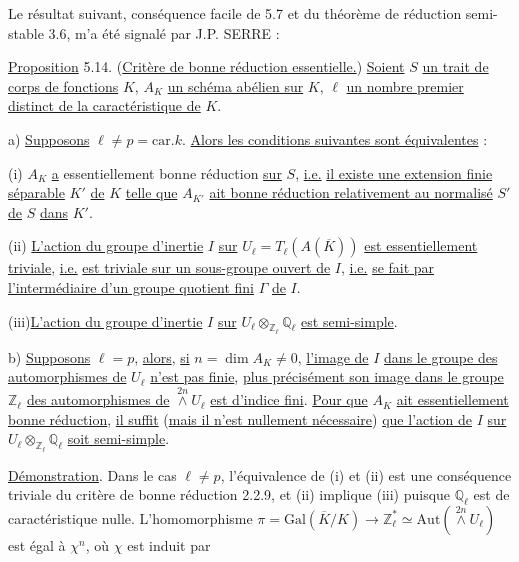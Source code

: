
Le résultat suivant, conséquence facile de 5.7 et du théorème de réduction semi-stable 3.6, m'a été signalé par J.P. SERRE :

\underline{Proposition} 5.14. (\underline{Critère de bonne réduction essentielle.}) \underline{Soient} $S$ \underline{un trait de corps de fonctions} $K$, $A_K$ \underline{un schéma abélien sur} $K$, $\ell$ \underline{un nombre premier distinct de la caractéristique de} $K$.

a) \underline{Supposons} $\ell \neq p = \mathrm{car}.k.$ \underline{Alors les conditions suivantes sont équivalentes} :

(i) $A_K$ \underline{a} essentiellement bonne réduction \underline{sur} $S$, \underline{i.e.} \underline{il existe une extension finie séparable} $K'$ \underline{de} $K$ \underline{telle que} $A_{K'}$ \underline{ait bonne réduction relativement au normalisé} $S'$ \underline{de} $S$ \underline{dans} $K'$.

(ii) \underline{L'action du groupe d'inertie} $I$ \underline{sur} $U_\ell = T_\ell(A(\overline{K}))$ \underline{est essentiellement triviale}, \underline{i.e.} \underline{est triviale sur un sous-groupe ouvert de} $I$, \underline{i.e.} \underline{se fait par l'intermédiaire d'un groupe quotient fini} $\Gamma$ \underline{de} $I$.

(iii)\underline{L'action du groupe d'inertie} $I$ \underline{sur} $U_\ell \otimes_{\mathbb{Z}_\ell} \mathbb{Q}_\ell$ \underline{est semi-simple}.

b) \underline{Supposons} $\ell = p$, \underline{alors}, \underline{si} $n = \dim A_K \neq 0$, \underline{l'image de} $I$ \underline{dans le groupe des automorphismes de} $U_\ell$ \underline{n'est pas finie}, \underline{plus précisément son image dans le groupe} $\mathbb{Z}_\ell$ \underline{des automorphismes de} $\stackrel{2n}{\wedge} U_\ell$ \underline{est d'indice fini}. \underline{Pour que} $A_K$ \underline{ait essentiellement bonne réduction}, \underline{il suffit} (\underline{mais il n'est nullement nécessaire}) \underline{que l'action de} $I$ \underline{sur} $U_\ell \otimes_{\mathbb{Z}_\ell} \mathbb{Q}_\ell$ \underline{soit semi-simple}.

\underline{Démonstration}. Dans le cas $\ell \neq p$, l'équivalence de (i) et (ii) est une conséquence triviale du critère de bonne réduction 2.2.9, et (ii) implique (iii) puisque $\mathbb{Q}_\ell$ est de caractéristique nulle. L'homomorphisme $\pi = \mathrm{Gal}(\overline{K}/K) \longrightarrow \mathbb{Z}^*_\ell \simeq \mathrm{Aut}(\stackrel{2n}{\wedge} U_\ell)$ est égal à $\chi^n$, où $\chi$ est induit par


